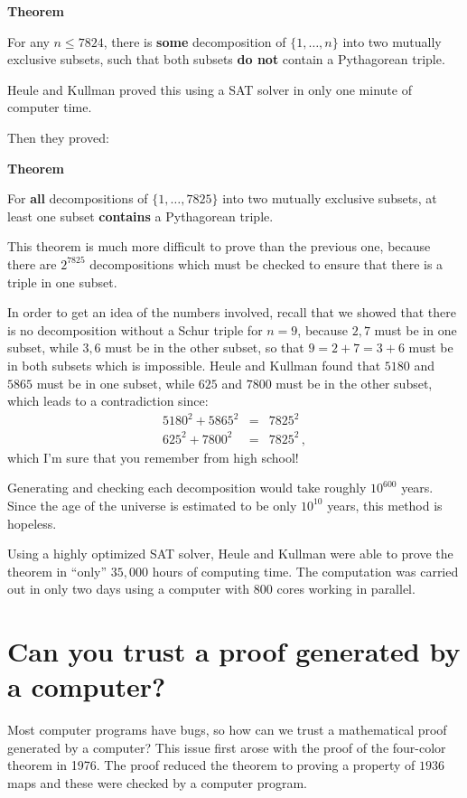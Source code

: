 \documentclass[11pt,a4paper]{article}
\begin{document}
\textbf{Theorem}

For any $n\leq 7824$, there is \textbf{some} decomposition of $\{1,\ldots,n\}$ into two mutually exclusive subsets, such that both subsets \textbf{do not} contain a Pythagorean triple.

Heule and Kullman proved this using a SAT solver in only one minute of computer time.

Then they proved:

\textbf{Theorem}

For \textbf{all} decompositions of $\{1,\ldots,7825\}$ into two mutually exclusive subsets, at least one subset \textbf{contains} a Pythagorean triple.

This theorem is much more difficult to prove than the previous one, because there are $2^{7825}$ decompositions which must be checked to ensure that there is a triple in one subset.

In order to get an idea of the numbers involved, recall that we showed that there is no decomposition without a Schur triple for $n=9$, because $2,7$ must be in one subset, while $3,6$ must be in the other subset, so that $9=2+7=3+6$ must be in both subsets which is impossible. Heule and Kullman found that $5180$ and $5865$ must be in one subset, while $625$ and $7800$ must be in the other subset, which leads to a contradiction since:
\begin{eqnarray*}
5180^2 + 5865^2 &=& 7825^2\\
625^2 + 7800^2 &=& 7825^2\,,
\end{eqnarray*}
which I'm sure that you remember from high school!

Generating and checking each decomposition would take roughly $10^{600}$ years. Since the age of the universe is estimated to be only $10^{10}$ years, this method is hopeless.

Using a highly optimized SAT solver, Heule and Kullman were able to prove the theorem in ``only'' $35,000$ hours of computing time. The computation was carried out in only two days using a computer with $800$ cores working in parallel.

\section{Can you trust a proof generated by a computer?}

Most computer programs have bugs, so how can we trust a mathematical proof generated by a computer? This issue first arose with the proof of the four-color theorem in 1976. The proof reduced the theorem to proving a property of $1936$ maps and these were checked by a computer program.
\end{document}
